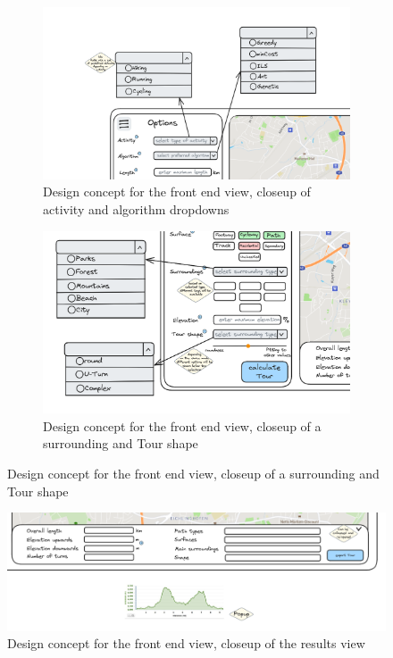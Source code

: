 \begin{figure}[H]
	\begin{subfigure}[t]{0.9\linewidth}
		\centering
		\includegraphics[width=\linewidth]{bilder/Concept closeup activity, algorithm.png}
		\caption{Design concept for the front end view, closeup of activity and algorithm dropdowns}
		\label{fig:frontendConceptCloseupDropdowns}	
	\end{subfigure}
	\hfill
	\begin{subfigure}[t]{0.9\linewidth}
		\centering
		\includegraphics[width=\linewidth]{bilder/Concept closeup surroundings, tour shape.png}
		\caption{Design concept for the front end view, closeup of a surrounding and Tour shape}
		\label{fig:frontendConceptCloseupButtons}		
	\end{subfigure}
\end{figure}


\begin{figure}[H]
	\includegraphics[width=0.9\linewidth]{bilder/Concept closeup tour stats, elevation profile.png}
	\caption{Design concept for the front end view, closeup of the results view}
	\label{fig:frontendConceptResultsCloseup}
\end{figure}




